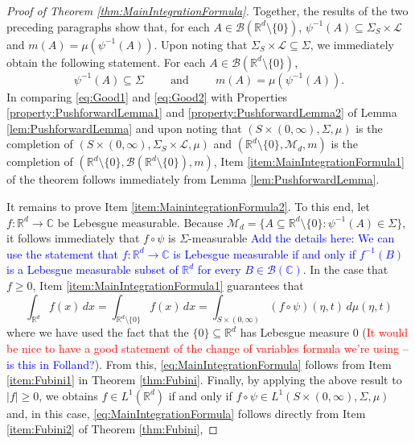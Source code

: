 \documentclass[11pt]{article}
\theoremstyle{theorem}
\begin{document}
\begin{proof}[Proof of Theorem \ref{thm:MainIntegrationFormula}]
Together, the results of the two preceding paragraphs show that, for each $A\in\mathcal{B}(\mathbb{R}^d\setminus\{0\})$, $\psi^{-1}(A)\subseteq \Sigma_S\times\mathcal{L}$ and $m(A)=\mu(\psi^{-1}(A))$. Upon noting that $\Sigma_S\times\mathcal{L}\subseteq \Sigma$, we immediately obtain the following statement. For each $A\in\mathcal{B}(\mathbb{R}^d\setminus\{0\})$,
\begin{equation}\label{eq:Good2}
\psi^{-1}(A)\subseteq \Sigma\hspace{1cm}\mbox{and}\hspace{1cm}m(A)=\mu(\psi^{-1}(A)).
\end{equation}
In comparing \eqref{eq:Good1} and \eqref{eq:Good2} with Properties \ref{property:PushforwardLemma1} and \ref{property:PushforwardLemma2} of Lemma \ref{lem:PushforwardLemma} and upon noting that $(S\times(0,\infty),\Sigma,\mu)$ is the completion of $(S\times(0,\infty),\Sigma_S\times\mathcal{L},\mu)$ and $(\mathbb{R}^d\setminus\{0\},\mathcal{M}_d,m)$ is the completion of $(\mathbb{R}^d\setminus\{0\},\mathcal{B}(\mathbb{R}^d\setminus\{0\}),m)$, Item \ref{item:MainIntegrationFormula1} of the theorem follows immediately from Lemma \ref{lem:PushforwardLemma}.

It remains to prove Item \ref{item:MainintegrationFormula2}. To this end, let $f:\mathbb{R}^d\to\mathbb{C}$ be Lebesgue measurable. Because $\mathcal{M}_d=\{A\subseteq \mathbb{R}^d\setminus\{0\}:\psi^{-1}(A)\in\Sigma\}$, it follows immediately that $f\circ\psi$ is $\Sigma$-measurable \textcolor{blue}{Add the details here: We can use the statement that $f:\mathbb{R}^d\to\mathbb{C}$ is Lebesgue measurable if and only if $f^{-1}(B)$ is a Lebesgue measurable subset of $\mathbb{R}^d$ for every $B\in\mathcal{B}(\mathbb{C})$}. In the case that $f\geq 0$, Item \ref{item:MainIntegrationFormula1} guarantees that
\begin{equation*}
\int_{\mathbb{R}^d}f(x)\,dx=\int_{\mathbb{R}^d\setminus \{0\}}f(x)\,dx=\int_{S\times (0,\infty)}(f\circ \psi)(\eta,t) \,d\mu(\eta,t)
\end{equation*}
where we have used the fact that the $\{0\}\subseteq\mathbb{R}^d$ has Lebesgue measure $0$  (\textcolor{red}{It would be nice to have a good statement of the change of variables formula we're using} -- \textcolor{blue}{is this in Folland?}). From this, \eqref{eq:MainIntegrationFormula} follows from Item \ref{item:Fubini1} in Theorem \ref{thm:Fubini}. Finally, by applying the above result to $|f|\geq 0$, we obtains $f\in L^1(\mathbb{R}^d)$ if and only if $f\circ \psi\in L^1(S\times (0,\infty),\Sigma,\mu)$ and, in this case, \eqref{eq:MainIntegrationFormula} follows directly from Item \ref{item:Fubini2} of Theorem \ref{thm:Fubini},
\end{proof}
\end{document}
